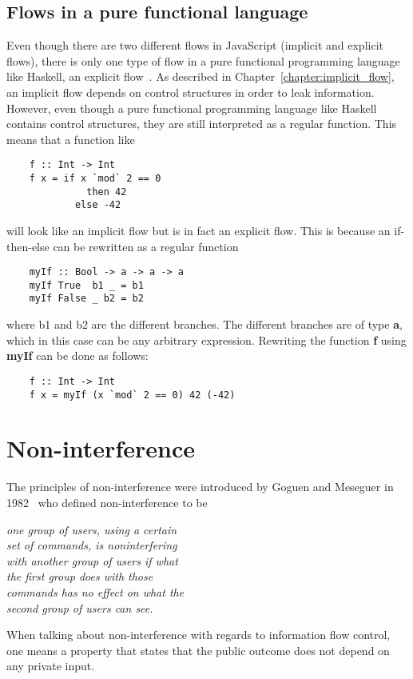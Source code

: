 \subsection{Flows in a pure functional language}
Even though there are two different flows in JavaScript (implicit and explicit flows), there is only one type of flow in a pure functional programming language like Haskell, an explicit flow~\cite{seclib}. As described in Chapter~\ref{chapter:implicit_flow}, an implicit flow depends on control structures in order to leak information. However, even though a pure functional programming language like Haskell contains control structures, they are still interpreted as a regular function. This means that a function like
\begin{verbatim}
    f :: Int -> Int
    f x = if x `mod` 2 == 0
              then 42
            else -42
\end{verbatim}
will look like an implicit flow but is in fact an explicit flow. This is because an if-then-else can be rewritten as a regular function~\cite{if-then-else}
\begin{verbatim}
    myIf :: Bool -> a -> a -> a
    myIf True  b1 _ = b1
    myIf False _ b2 = b2
\end{verbatim}
where b1 and b2 are the different branches. The different branches are of type \textbf{a}, which in this case can be any arbitrary expression. Rewriting the function \textbf{f} using \textbf{myIf} can be done as follows:
\begin{verbatim}
    f :: Int -> Int
    f x = myIf (x `mod` 2 == 0) 42 (-42)
\end{verbatim}

\section{Non-interference}
The principles of non-interference were introduced by Goguen and Meseguer in 1982~\cite{non-interference-goguen-meseguer} who defined non-interference to be
\newline
\begin{center}
  \emph{one group of users, using a certain\\set of commands, is noninterfering\\with another group of users if what\\the first group does with those\\commands has no effect on what the\\second group of users can see.}
\end{center}
When talking about non-interference with regards to information flow control, one means a property that states that the public outcome does not depend on any private input.


